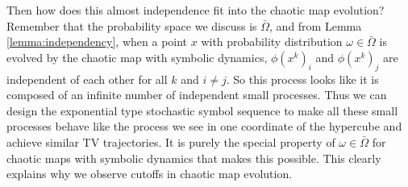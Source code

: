 Then how does this almost independence fit into the chaotic map evolution? Remember that the probability space we discuss is $\bar{\Omega}$, and from Lemma \ref{lemma:independency}, when a point $x$ with probability distribution $\omega \in \bar{\Omega}$ is evolved by the chaotic map with symbolic dynamics, $\phi(x^k)_i$ and $\phi(x^k)_j$ are independent of each other for all $k$ and $i\neq j$. So this process looks like it is composed of an infinite number of independent small processes. Thus we can design the exponential type stochastic symbol sequence to make all these small processes behave like the process we see in one coordinate of the hypercube and achieve similar TV trajectories. It is purely the special property of $\omega \in \bar{\Omega}$ for chaotic maps with symbolic dynamics that makes this possible. This clearly explains why we observe cutoffs in chaotic map evolution.  

 




